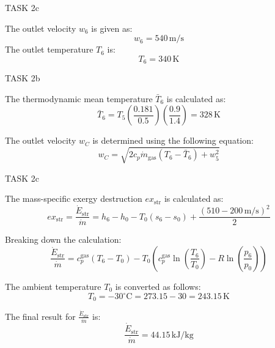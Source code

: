 TASK 2c

The outlet velocity \( w_6 \) is given as:
\[
w_6 = 540 \, \text{m/s}
\]
The outlet temperature \( T_6 \) is:
\[
T_6 = 340 \, \text{K}
\]

TASK 2b

The thermodynamic mean temperature \( \bar{T}_6 \) is calculated as:
\[
\bar{T}_6 = T_5 \left( \frac{0.181}{0.5} \right) \left( \frac{0.9}{1.4} \right) = 328 \, \text{K}
\]

The outlet velocity \( w_C \) is determined using the following equation:
\[
w_C = \sqrt{2 c_p \dot{m}_{\text{gas}} \left( T_6 - \bar{T}_6 \right) + w_5^2}
\]

TASK 2c

The mass-specific exergy destruction \( ex_{\text{str}} \) is calculated as:
\[
ex_{\text{str}} = \frac{\dot{E}_{\text{str}}}{\dot{m}} = h_6 - h_0 - T_0 \left( s_6 - s_0 \right) + \frac{\left( 510 - 200 \, \text{m/s} \right)^2}{2}
\]

Breaking down the calculation:
\[
\frac{\dot{E}_{\text{str}}}{\dot{m}} = c_p^{\text{gas}} \left( T_6 - T_0 \right) - T_0 \left( c_p^{\text{gas}} \ln \left( \frac{T_6}{T_0} \right) - R \ln \left( \frac{p_6}{p_0} \right) \right)
\]

The ambient temperature \( T_0 \) is converted as follows:
\[
T_0 = -30^\circ\text{C} = 273.15 - 30 = 243.15 \, \text{K}
\]

The final result for \( \frac{\dot{E}_{\text{str}}}{\dot{m}} \) is:
\[
\frac{\dot{E}_{\text{str}}}{\dot{m}} = 44.15 \, \text{kJ/kg}
\]